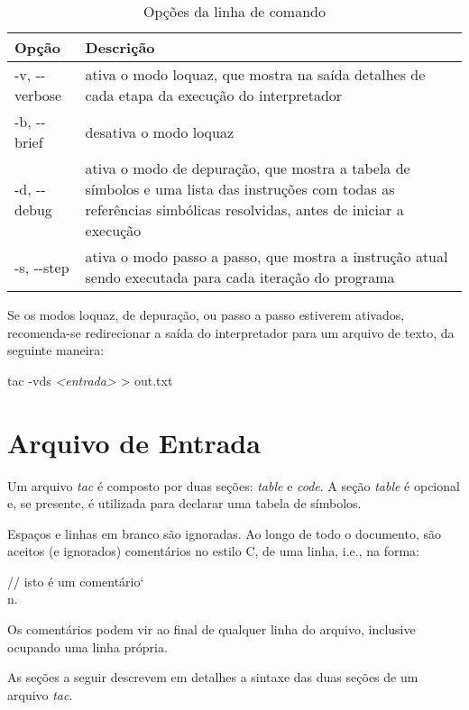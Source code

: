 \documentclass[12pt,a4paper,extrafontsizes,article]{memoir}
\newcommand*{\srcfont}{\fontfamily{pcr}\selectfont}
\begin{document}
\begin{table}
\centering
\caption{Opções da linha de comando}
\label{tab:cmdlineopts}
\begin{tabular}{| l | l |} \toprule
Opção & Descrição\\ \midrule
{\srcfont -v, -{}-verbose} & \parbox{0.7\linewidth}{ativa o modo loquaz, que mostra na saída detalhes de cada etapa da
execução do interpretador}\\ \midrule
{\srcfont -b, -{}-brief} & \parbox{0.7\linewidth}{desativa o modo loquaz}\\ \midrule
{\srcfont -d, -{}-debug} & \parbox{0.7\linewidth}{ativa o modo de depuração, que mostra a tabela de símbolos e uma lista
das instruções com todas as referências simbólicas resolvidas, antes de iniciar a execução}\\ \midrule
{\srcfont -s, -{}-step} & \parbox{0.7\linewidth}{ativa o modo passo a passo, que mostra a instrução atual sendo
executada para cada iteração do programa}\\ \bottomrule
\end{tabular}
\end{table}

Se os modos loquaz, de depuração, ou passo a passo estiverem ativados, recomenda-se redirecionar a saída do
interpretador para um arquivo de texto, da seguinte maneira:

\bigskip
{\srcfont tac -vds \textit{<entrada>} > out.txt}


\clearpage
\chapter{Arquivo de Entrada}

Um arquivo \textit{tac} é composto por duas seções: \textit{table} e \textit{code}. A seção \textit{table} é opcional e,
se presente, é utilizada para declarar uma tabela de símbolos.

Espaços e linhas em branco são ignoradas. Ao longo de todo o documento, são aceitos (e ignorados) comentários no estilo
C, de uma linha, i.e., na forma:

\bigskip
{\srcfont // isto é um comentário{\color{red}\char`\\n}}.
\bigskip

Os comentários podem vir ao final de qualquer linha do arquivo, inclusive ocupando uma linha própria.

As seções a seguir descrevem em detalhes a sintaxe das duas seções de um arquivo \textit{tac}.
\end{document}
